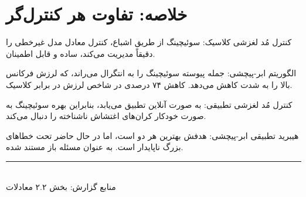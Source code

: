 \documentclass[12pt, a4paper]{article}
\newcommand{\dash}{\lr{---}}
\begin{document}
\vspace{0.6cm}

\section{خلاصه: تفاوت هر کنترل‌گر}

کنترل مُد لغزشی کلاسيک: سوئيچينگ از طريق اشباع، کنترل معادل مدل غيرخطی را دقيقاً مديريت می‌کند، ساده و قابل اطمينان.

الگوريتم ابر-پيچشی: جمله پيوسته  سوئيچينگ را به انتگرال  می‌راند، که لرزش فرکانس بالا را به شدت کاهش می‌دهد. کاهش ۷۴ درصدی در شاخص لرزش در برابر کلاسيک.

کنترل مُد لغزشی تطبيقی:  به صورت آنلاين تطبيق می‌يابد، بنابراين بهره سوئيچينگ به صورت خودکار کران‌های اغتشاش ناشناخته را دنبال می‌کند.

هيبريد تطبيقی ابر-پيچشی: هدفش بهترين هر دو است، اما در حال حاضر تحت خطاهای بزرگ ناپايدار است. به عنوان مسئله باز مستند شده.

\vspace{1.5cm}
\begin{center}
{\color{seriesblue}\rule{0.45\linewidth}{0.4pt}}\\[8pt]
{\small\color{sectiongray}
منابع گزارش: بخش ۲.۲ \dash{} معادلات 
}
\end{center}
\end{document}
